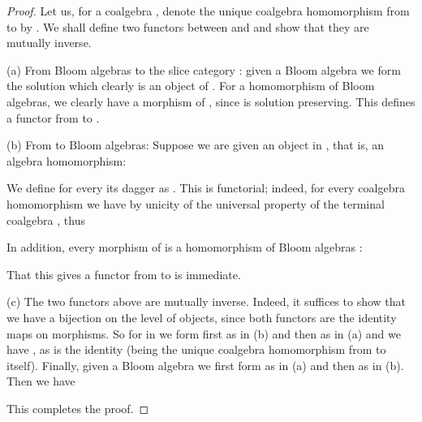 \documentclass{LMCS}
\theoremstyle{plain}
\theoremstyle{definition}
\numberwithin{equation}{section}
\begin{document}
\begin{proof}
Let us, for a coalgebra , denote the unique coalgebra homomorphism from  to  by .
We shall define two functors between  and  and show that they are mutually  inverse.

(a) From Bloom algebras to the slice category : given a Bloom algebra  we form the solution  which clearly is an object  of . For a homomorphism  of Bloom algebras, we clearly have a morphism  of , since  is solution preserving. This defines a functor from  to .

(b) From  to Bloom algebras: Suppose we are given an object  in , that is, an algebra homomorphism:

We define for every   its dagger as . This is functorial; indeed, for every coalgebra homomorphism  we have  by unicity of the universal property of the terminal coalgebra , thus

 In addition, every morphism  of  is a homomorphism of Bloom algebras :

That this gives a functor from  to  is immediate.

(c) The two functors above  are mutually inverse. Indeed, it suffices to show that we have  a bijection on the level of objects, since both functors    are  the identity maps on morphisms. So for  in  we form first  as in (b) and then  as in (a) and we have , as  is the identity (being the unique coalgebra homomorphism from  to itself). Finally, given a Bloom algebra  we first form  as in (a) and then  as in (b). Then we have

This completes the proof.
\end{proof}
\end{document}
